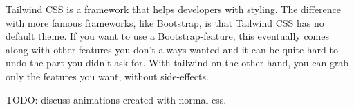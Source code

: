 Tailwind CSS \cite{tailwind-css} is a framework that helps developers with styling. The difference with more famous frameworks, like Bootstrap, is that Tailwind CSS has no default theme. If you want to use a Bootstrap-feature, this eventually comes along with other features you don't always wanted and it can be quite hard to undo the part you didn't ask for. With tailwind on the other hand, you can grab only the features you want, without side-effects. 

TODO: discuss animations created with normal css.

